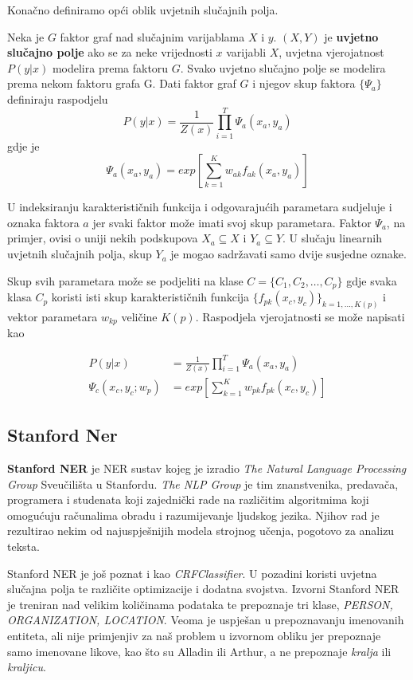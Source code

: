 \documentclass[conference]{IEEEtran}
\begin{document}
		Konačno definiramo opći oblik uvjetnih slučajnih polja.
		
		Neka je $G$ faktor graf nad slučajnim varijablama $X$ i $y$. $(X,Y)$ je \textbf{uvjetno slučajno polje} ako se za neke vrijednosti $x$ varijabli $X$, uvjetna vjerojatnost $P(y|x)$ modelira prema faktoru $G$. 
		Svako uvjetno slučajno polje se modelira prema nekom faktoru grafa G.  Dati faktor graf $G$ i njegov skup faktora $\{\Psi_a \}$ definiraju raspodjelu \[ P(y|x) = \frac{1}{Z(x)} \prod_{i=1}^T \Psi_a(x_a,y_a) \]
		gdje je \[ \Psi_a(x_a,y_a) = exp \left[ \sum_{k=1}^K w_{ak} f_{ak}(x_a,y_a)\right] \]
		
		U indeksiranju karakterističnih funkcija i odgovarajućih parametara sudjeluje i oznaka faktora $a$ jer svaki faktor može imati svoj skup parametara. Faktor $\Psi_a$, na primjer, ovisi o uniji nekih podskupova $X_a \subseteq X$ i $Y_a \subseteq Y$. U slučaju linearnih uvjetnih slučajnih polja, skup $Y_a$ je mogao sadržavati samo dvije susjedne oznake.
		
		Skup svih parametara može se podjeliti na klase $C=\{C_1, C_2, \ldots , C_p\}$ gdje svaka klasa $C_p$ koristi isti skup karakterističnih funkcija $\{ f_{pk} (x_c,y_c)\}_{k= 1,\ldots,K(p)}$ i vektor parametara $w_{kp}$ veličine $K(p)$. Raspodjela vjerojatnosti se može napisati kao

		\begin{align*}
		P(y|x) &= \frac{1}{Z(x)} \prod_{i=1}^T \Psi_a(x_a,y_a) \\
		\Psi_c(x_c,y_c;w_p) &= exp \left[ \sum_{k=1}^K w_{pk} f_{pk}(x_c,y_c)\right]
		\end{align*}
	 
	\subsection{Stanford Ner}
	\textbf{Stanford NER} je NER sustav kojeg je izradio \textit{The Natural Language Processing Group}
	Sveučilišta u Stanfordu. \textit{The NLP Group} je tim znanstvenika, predavača, programera i studenata koji zajednički rade na različitim algoritmima koji omogućuju računalima obradu i razumijevanje ljudskog jezika. Njihov rad je rezultirao nekim od najuspješnijih modela strojnog učenja, pogotovo za analizu teksta.
	
	Stanford NER je još poznat i kao \textit{CRFClassifier}. U pozadini koristi uvjetna slučajna polja te različite optimizacije i dodatna svojstva. Izvorni Stanford NER je treniran nad velikim količinama podataka te prepoznaje tri klase, \textit{PERSON, ORGANIZATION, LOCATION}.
	Veoma je uspješan u prepoznavanju imenovanih entiteta, ali nije primjenjiv za naš problem u izvornom obliku jer prepoznaje samo imenovane likove, kao što su Alladin ili Arthur, a ne prepoznaje \textit{kralja} ili \textit{kraljicu}.
	
\end{document}
